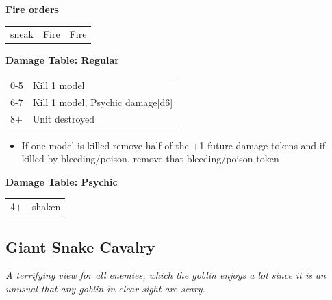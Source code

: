 \documentclass[a4paper,12pt]{article}
\begin{document}
\noindent\textbf{Fire orders}

\begin{tabular}{lll}
sneak & Fire & Fire \\
\end{tabular}
\vspace{1ex}


\noindent\textbf{Damage Table: Regular}

\begin{tabular}{@{}lp{}@{}}
0-5 & Kill 1 model \\
6-7 & Kill 1 model, Psychic damage[d6] \\
8+ & Unit destroyed \\
\end{tabular}
\begin{itemize}
\item If one model is killed remove half of the +1 future damage tokens and if killed by bleeding/poison, remove that bleeding/poison token
\end{itemize}
\vspace{1ex}

\noindent\textbf{Damage Table: Psychic}

\begin{tabular}{@{}lp{}@{}}
4+ & shaken \\
\end{tabular}
\vspace{1ex}
\subsection{Giant Snake Cavalry}
\label{unit-giant-snake-cavalry}

\textit{A terrifying view for all enemies, which the goblin enjoys a lot since it is an unusual that any goblin in clear sight are scary.}
\end{document}
